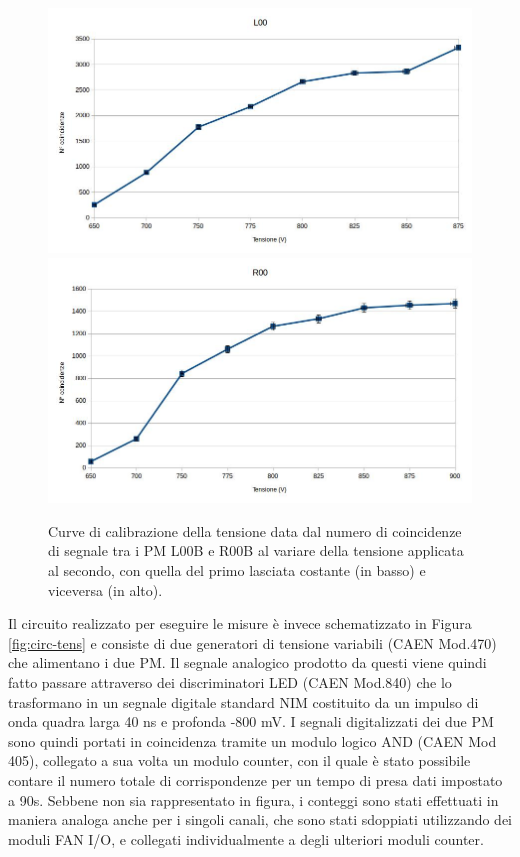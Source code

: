 \documentclass{standalone}
\begin{document}
	\begin{figure}[H]
		\begin{center}
			\includegraphics[width=1\textwidth]{./excel-plots/tension-L00c.jpg} %
			\bigbreak
			\includegraphics[width=1\textwidth]{./excel-plots/tension-R00c.jpg} %
      \caption{\small Curve di calibrazione della tensione data dal numero di coincidenze di segnale tra i PM L00B e R00B al variare della tensione applicata al secondo, con quella del primo lasciata costante (in basso) e viceversa (in alto).}
			\label{fig:curva-tens}
		\end{center}
	\end{figure}
	\clearpage
	Il circuito realizzato per eseguire le misure \`e invece schematizzato in Figura \ref{fig:circ-tens} e consiste di due generatori di tensione variabili (CAEN Mod.470) che alimentano i due PM. Il segnale analogico prodotto da questi viene quindi fatto passare attraverso dei discriminatori LED (CAEN Mod.840) che lo trasformano in un segnale digitale standard NIM costituito da un impulso di onda quadra larga 40 ns e profonda -800 mV. I segnali digitalizzati dei due PM sono quindi portati in coincidenza tramite un modulo logico AND (CAEN Mod 405), collegato a sua volta un modulo counter, con il quale \`e  stato possibile contare il numero totale di corrispondenze per un tempo di presa dati impostato a 90s. Sebbene non sia rappresentato in figura, i conteggi sono stati effettuati in maniera analoga anche  per i singoli canali, che sono stati sdoppiati utilizzando dei moduli FAN I/O, e collegati individualmente a degli ulteriori moduli counter.\\
\end{document}
